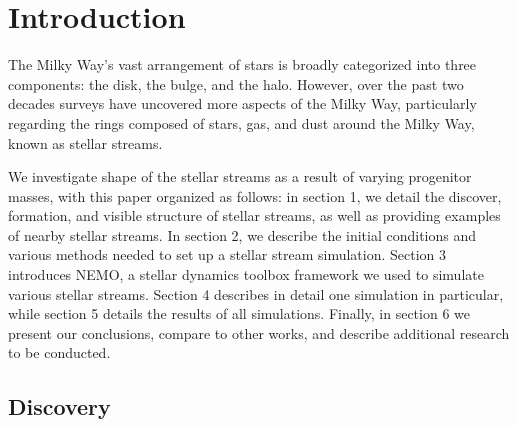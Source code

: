\documentclass[twocolumn]{article}
\begin{document}

\section{Introduction}

The Milky Way's vast arrangement of stars is broadly categorized into three components: the disk, the bulge, and the halo. However, over the past two decades surveys have uncovered more aspects of the Milky Way, particularly regarding the rings composed of stars, gas, and dust around the Milky Way, known as stellar streams. 

We investigate shape of the stellar streams as a result of varying progenitor masses, with this paper organized as follows: in section 1, we detail the discover, formation, and visible structure of stellar streams, as well as providing examples of nearby stellar streams. In section 2, we describe the initial conditions and various methods needed to set up a stellar stream simulation. Section 3 introduces NEMO, a stellar dynamics toolbox framework we used to simulate various stellar streams. Section 4 describes in detail one simulation in particular, while section 5 details the results of all simulations. Finally, in section 6 we present our conclusions, compare to other works, and describe additional research to be conducted.

\subsection{Discovery}
\end{document}

